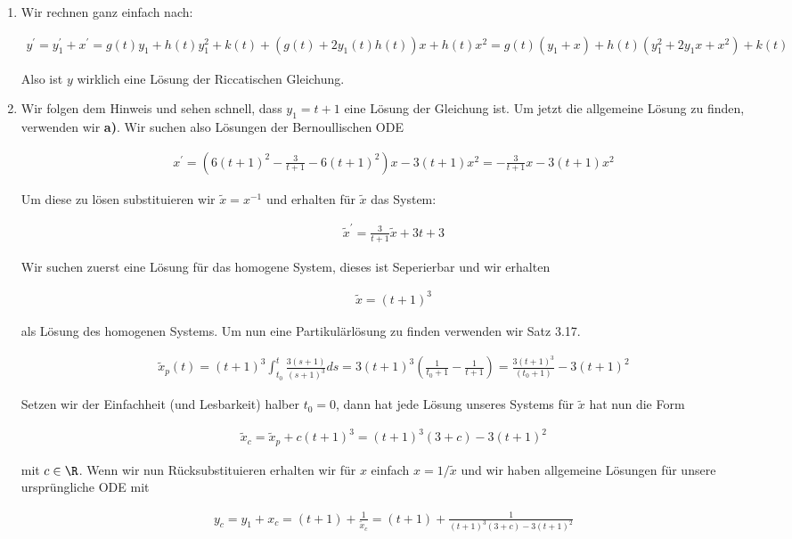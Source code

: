 \begin{solution}
\begin{enumerate}[label = \textbf{\alph*)}]
  \item Wir rechnen ganz einfach nach:

  \begin{align*}
    y^\prime = y_1^\prime + x^\prime = g(t)y_1 +h(t)y_1^2 + k(t) +
    (g(t) + 2y_1(t)h(t))x + h(t)x^2 = g(t)(y_1+x) + h(t)(y_1^2 +2y_1x +x^2) + k(t)
  \end{align*}

  Also ist $y$ wirklich eine Lösung der Riccatischen Gleichung.

  \item Wir folgen dem Hinweis und sehen schnell, dass $y_1 = t+1$ eine Lösung der Gleichung ist.
  Um jetzt die allgemeine Lösung zu finden, verwenden wir \textbf{a)}. Wir suchen also
  Lösungen der Bernoullischen ODE

  \begin{align*}
    x^\prime = (6(t+1)^2 -\frac{3}{t+1}-6(t+1)^2)x - 3(t+1)x^2 = -\frac{3}{t+1}x
    -3(t+1)x^2
  \end{align*}

  Um diese zu lösen substituieren wir $\widetilde{x}=x^{-1}$ und erhalten für
  $\widetilde{x}$ das System:

  \begin{align*}
    \widetilde{x}^\prime = \frac{3}{t+1}\widetilde{x} + 3t+3
  \end{align*}

  Wir suchen zuerst eine Lösung für das homogene System, dieses ist Seperierbar und wir erhalten

  \begin{align*}
    \widetilde{x}=(t+1)^3
  \end{align*}

  als Lösung des homogenen Systems. Um nun eine Partikulärlösung zu finden verwenden
  wir Satz 3.17.

  \begin{align*}
    \widetilde{x}_p(t) = (t+1)^3 \int_{t_0}^t \frac{3(s+1)}{(s+1)^3}  ds=
    3(t+1)^3(\frac{1}{t_0 + 1}-\frac{1}{t+1}) = \frac{3(t+1)^3}{(t_0+1)} - 3(t+1)^2
  \end{align*}

  Setzen wir der Einfachheit (und Lesbarkeit) halber $t_0 = 0$, dann hat
  jede Lösung unseres Systems für $\widetilde{x}$ hat nun die Form

  \begin{align*}
    \widetilde{x}_c = \widetilde{x}_p + c(t+1)^3 = (t+1)^3(3+c)-3(t+1)^2
  \end{align*}

  mit $c \in \R$.
  Wenn wir nun Rücksubstituieren erhalten wir für $x$ einfach $x = 1/\widetilde{x}$ und
  wir haben allgemeine Lösungen für unsere ursprüngliche ODE mit

  \begin{align*}
    y_c = y_1 + x_c = (t+1) + \frac{1}{\widetilde{x}_c} = (t+1) + \frac{1}{(t+1)^3(3+c)-3(t+1)^2}
  \end{align*}
\end{enumerate}
\end{solution}
